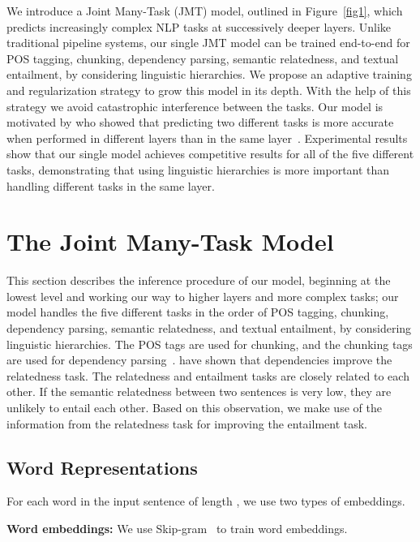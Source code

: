 \documentclass[11pt,a4paper]{article}
\begin{document}
We introduce a Joint Many-Task (JMT) model, outlined in Figure~\ref{fig1}, which predicts increasingly complex NLP tasks at successively deeper layers.
Unlike traditional pipeline systems, our single JMT model can be trained end-to-end for POS tagging, chunking, dependency parsing, semantic relatedness, and textual entailment, by considering linguistic hierarchies.
We propose an adaptive training and regularization strategy to grow this model in its depth. 
With the help of this strategy we avoid catastrophic interference between the tasks.
Our model is motivated by \citet{sogaard2016} who showed that predicting two different tasks is more accurate when performed in different layers than in the same layer~\citep{collobert2011senna}.
Experimental results show that our single model achieves competitive results for all of the five different tasks, demonstrating that using linguistic hierarchies is more important than handling different tasks in the same layer.


\section{The Joint Many-Task Model}
This section describes the inference procedure of our model, beginning at the lowest level and working our way to higher layers and more complex tasks; our model handles the five different tasks in the order of POS tagging, chunking, dependency parsing, semantic relatedness, and textual entailment, by considering linguistic hierarchies.
The POS tags are used for chunking, and the chunking tags are used for dependency parsing~\citep{Attardi2008}.
\citet{tai2015treelstm} have shown that dependencies improve the relatedness task.
The relatedness and entailment tasks are closely related to each other.
If the semantic relatedness between two sentences is very low, they are unlikely to entail each other.
Based on this observation, we make use of the information from the relatedness task for improving the entailment task.

\subsection{Word Representations}
\label{subsec:wordrep}
For each word  in the input sentence  of length , we use two types of embeddings.

\noindent
{\bf Word embeddings:}
We use Skip-gram~\citep{mikolov2013word2vec} to train word embeddings.
\end{document}
